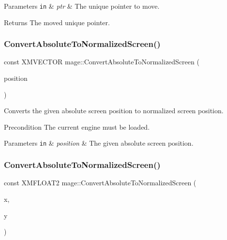 \begin{DoxyParams}[1]{Parameters}
\mbox{\tt in}  & {\em ptr} & The unique pointer to move. \\
\hline
\end{DoxyParams}
\begin{DoxyReturn}{Returns}
The moved unique pointer. 
\end{DoxyReturn}
\hypertarget{namespacemage_add9fc09b8a7166c5e0d0bde63d8f2747}{}\label{namespacemage_add9fc09b8a7166c5e0d0bde63d8f2747} 
\subsubsection{\texorpdfstring{Convert\+Absolute\+To\+Normalized\+Screen()}{ConvertAbsoluteToNormalizedScreen()}\hspace{0.1cm}{\footnotesize\ttfamily [1/3]}}
{\footnotesize\ttfamily const X\+M\+V\+E\+C\+T\+OR mage\+::\+Convert\+Absolute\+To\+Normalized\+Screen (\begin{DoxyParamCaption}\item[{const X\+M\+V\+E\+C\+T\+OR \&}]{position }\end{DoxyParamCaption})}

Converts the given absolute screen position to normalized screen position.

\begin{DoxyPrecond}{Precondition}
The current engine must be loaded. 
\end{DoxyPrecond}

\begin{DoxyParams}[1]{Parameters}
\mbox{\tt in}  & {\em position} & The given absolute screen position. \\
\hline
\end{DoxyParams}
\hypertarget{namespacemage_a98a82c6ca513d50f16d4ee6256fdac29}{}\label{namespacemage_a98a82c6ca513d50f16d4ee6256fdac29} 
\subsubsection{\texorpdfstring{Convert\+Absolute\+To\+Normalized\+Screen()}{ConvertAbsoluteToNormalizedScreen()}\hspace{0.1cm}{\footnotesize\ttfamily [2/3]}}
{\footnotesize\ttfamily const X\+M\+F\+L\+O\+A\+T2 mage\+::\+Convert\+Absolute\+To\+Normalized\+Screen (\begin{DoxyParamCaption}\item[{float}]{x,  }\item[{float}]{y }\end{DoxyParamCaption})}

